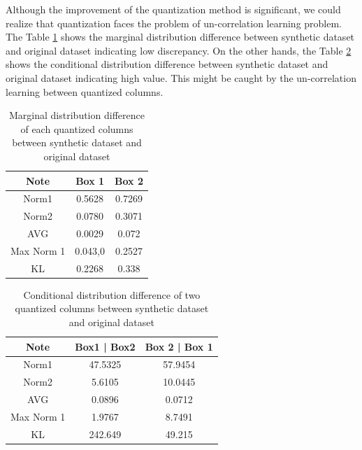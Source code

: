 \documentclass{article}
\begin{document}
Although the improvement of the quantization method is significant, we could realize that quantization faces the problem of un-correlation learning problem. The Table \ref{tab:marbox} shows the marginal distribution difference between synthetic dataset and original dataset indicating low discrepancy. On the other hands, the Table \ref{tab:corbox} shows the conditional distribution difference between synthetic dataset and original dataset indicating high value. This might be caught by the un-correlation learning between quantized columns. 

\begin{table}[htpb] \centering
	\begin{tabular}{|c|c |c |}
		\hline
		\textbf{Note} & \textbf{Box 1} & \textbf{Box 2} \\ \hline
		Norm1         & 0.5628         & 0.7269         \\ \hline
		Norm2         & 0.0780         & 0.3071         \\ \hline
		AVG           & 0.0029         & 0.072          \\ \hline
		Max Norm 1    & 0.043,0        & 0.2527         \\ \hline
		KL            & 0.2268         & 0.338          \\ \hline
	\end{tabular}
\caption{Marginal distribution difference of each quantized columns between synthetic dataset and original dataset}
\label{tab:marbox}
\end{table}

\begin{table}[htpb]\centering
	\begin{tabular}{|c|c|c|}
		\hline
		\textbf{Note} & \textbf{Box1 | Box2}        & \textbf{Box 2 | Box 1}       \\ \hline
		Norm1         &  47.5325 &  57.9454 \\ \hline
		Norm2         &  5.6105  &  10.0445 \\ \hline
		AVG           &  0.0896  &  0.0712  \\ \hline
		Max Norm 1    &  1.9767  &  8.7491  \\ \hline
		KL            &  242.649 &  49.215  \\ \hline
	\end{tabular}
\caption{Conditional distribution difference of two quantized columns between synthetic dataset and original dataset}
\label{tab:corbox}
\end{table}
\end{document}
